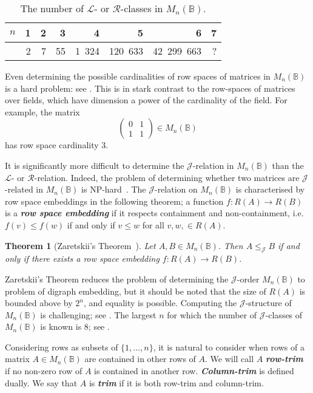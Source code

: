 \documentclass[11pt]{article}
\newtheorem{thm}{Theorem}[section]
\newcommand{\defn}[1]{\textbf{\textit{#1}}}
\numberwithin{equation}{section}
\renewcommand{\to}{\longrightarrow}
\newcommand{\B}{\mathbb{B}}
\newcommand{\Bn}{M_n(\B)}
\renewcommand{\L}{\mathscr{L}}
\newcommand{\R}{\mathscr{R}}
\newcommand{\J}{\mathscr{J}}
\newcommand{\mat}[4]{\begin{pmatrix}#1&#2\\#3&#4\end{pmatrix}}
\begin{document}
\begin{table}
  \centering
  \begin{tabular}{r|r|r|r|r|r|r|r}
    $n$ & 1 & 2 & 3 & 4 & 5 & 6 & 7 \\
    \hline
     & 2 & 7 & 55 & 1\ 324& 120\ 633& 42\ 299\ 663& ?  
  \end{tabular}
\vspace{1cm}

\caption{The number of $\L$- or $\R$-classes in $\Bn$.} 
  \label{tab:NumberLRClasses}
\end{table}

Even determining the possible cardinalities of row spaces of matrices in $\Bn$
is a hard problem: see \cite{Breen2001aa, Konieczny1992aa, Li1995aa,
  Shaofang1998aa, Zivkovic2006aa}. This is in stark contrast to the row-spaces
of matrices over fields, which have dimension a power of the cardinality of the
field. For example, the matrix \[\mat{0}{1}{1}{1} \in \Bn\] has row space
cardinality $3$.

It is significantly more difficult to determine the $\J$-relation in $\Bn$ than
the $\L$- or $\R$-relation. Indeed, the problem of determining whether two
matrices are $\J$-related in $\Bn$ is NP-hard~\cite[Theorem 2.7]{Fenner2018aa}.
The $\J$-relation on $\Bn$ is characterised by row space embeddings in the
following theorem; a function $f: R(A) \to R(B)$ is a \defn{row space embedding}
if it respects containment and non-containment, i.e.\ $f(v) \leq f(w)$ if and
only if $v \leq w$ for all $v, w,
\in R(A)$.
\begin{thm}[Zaretskii's Theorem~\cite{Zaretskii1963aa}]
  Let $A, B \in \Bn$. Then $A \leq_{\J} B$ if and only if there exists a row
  space embedding $f: R(A) \to R(B)$.
\end{thm}
Zaretskii's Theorem reduces the problem of determining the $\J$-order $\Bn$ to
problem of digraph embedding, but it should be noted that the size of $R(A)$ is
bounded above by $2^n$, and equality is possible. Computing the $\J$-structure of
$\Bn$ is challenging; see \cite{Breen1997aa}. The largest $n$ for which the
number of $\J$-classes of $\Bn$ is known is $8$; see \cite{Breen2001aa}.


Considering rows as subsets of $\{1, \ldots, n\}$, it is natural to consider
when rows of a matrix $A \in \Bn$ are contained in other rows of $A$. We will
call $A$ \defn{row-trim} if no non-zero row of $A$ is contained in another row.
\defn{Column-trim} is defined dually. We say that $A$ is \defn{trim} if it is
both row-trim and column-trim.
\end{document}
